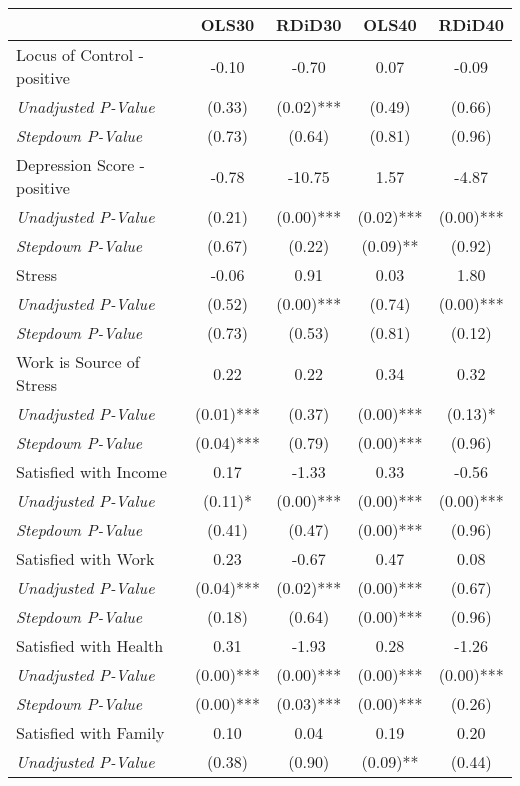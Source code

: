 \begin{tabular}{l c c c c}
\toprule
 & OLS30 & RDiD30 & OLS40 & RDiD40 \\
\midrule
Locus of Control - positive & -0.10 & -0.70 & 0.07 & -0.09 \\
\quad \textit{Unadjusted P-Value} & (0.33) & (0.02)*** & (0.49) & (0.66) \\
\quad \textit{Stepdown P-Value} & (0.73) & (0.64) & (0.81) & (0.96) \\
Depression Score - positive & -0.78 & -10.75 & 1.57 & -4.87 \\
\quad \textit{Unadjusted P-Value} & (0.21) & (0.00)*** & (0.02)*** & (0.00)*** \\
\quad \textit{Stepdown P-Value} & (0.67) & (0.22) & (0.09)** & (0.92) \\
Stress & -0.06 & 0.91 & 0.03 & 1.80 \\
\quad \textit{Unadjusted P-Value} & (0.52) & (0.00)*** & (0.74) & (0.00)*** \\
\quad \textit{Stepdown P-Value} & (0.73) & (0.53) & (0.81) & (0.12) \\
Work is Source of Stress & 0.22 & 0.22 & 0.34 & 0.32 \\
\quad \textit{Unadjusted P-Value} & (0.01)*** & (0.37) & (0.00)*** & (0.13)* \\
\quad \textit{Stepdown P-Value} & (0.04)*** & (0.79) & (0.00)*** & (0.96) \\
Satisfied with Income & 0.17 & -1.33 & 0.33 & -0.56 \\
\quad \textit{Unadjusted P-Value} & (0.11)* & (0.00)*** & (0.00)*** & (0.00)*** \\
\quad \textit{Stepdown P-Value} & (0.41) & (0.47) & (0.00)*** & (0.96) \\
Satisfied with Work & 0.23 & -0.67 & 0.47 & 0.08 \\
\quad \textit{Unadjusted P-Value} & (0.04)*** & (0.02)*** & (0.00)*** & (0.67) \\
\quad \textit{Stepdown P-Value} & (0.18) & (0.64) & (0.00)*** & (0.96) \\
Satisfied with Health & 0.31 & -1.93 & 0.28 & -1.26 \\
\quad \textit{Unadjusted P-Value} & (0.00)*** & (0.00)*** & (0.00)*** & (0.00)*** \\
\quad \textit{Stepdown P-Value} & (0.00)*** & (0.03)*** & (0.00)*** & (0.26) \\
Satisfied with Family & 0.10 & 0.04 & 0.19 & 0.20 \\
\quad \textit{Unadjusted P-Value} & (0.38) & (0.90) & (0.09)** & (0.44) \\

\end{tabular}
